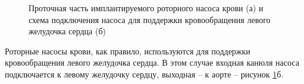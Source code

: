 \begin{figure}[ht]
  \begin{minipage}[ht]{0.54\linewidth}
  \end{minipage} 
  \hfill
  \begin{minipage}[ht]{0.42\linewidth}
  \end{minipage}
  \caption{Проточная часть имплантируемого роторного насоса крови (а) и схема подключения насоса для поддержки кровообращения левого желудочка сердца (б)}
  \label{img:pump_view}  
\end{figure}

Роторные насосы крови, как правило, используются для поддержки кровообращения левого желудочка сердца. В этом случае входная канюля насоса подключается к левому желудочку сердцу, выходная -- к аорте -- рисунок \ref{img:pump_view}б. 

